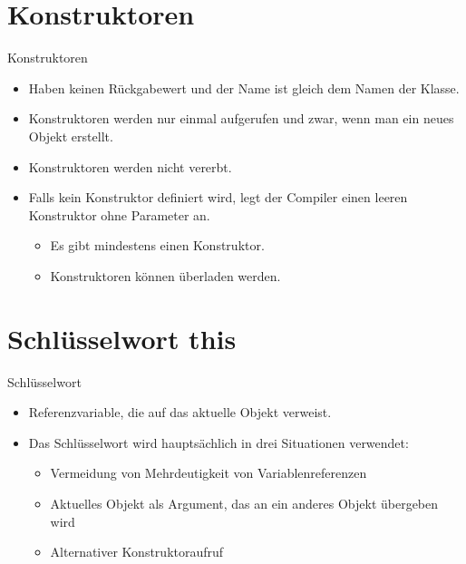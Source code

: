 \documentclass{../tuda-beamer}
\begin{document}
  \section{Konstruktoren}
  \begin{frame}{Konstruktoren}
    \begin{itemize}
      \item Haben keinen Rückgabewert und der Name ist gleich dem Namen der Klasse.
      \item Konstruktoren werden nur einmal aufgerufen und zwar, wenn man ein neues Objekt erstellt.
      \item Konstruktoren werden nicht vererbt.
      \item Falls kein Konstruktor definiert wird, legt der Compiler einen leeren Konstruktor ohne
      Parameter an.
      \begin{itemize}
        \item Es gibt mindestens einen Konstruktor.
        \item Konstruktoren können überladen werden.
      \end{itemize}

      
    \end{itemize}
  \end{frame}

  \begin{frame}[c]
    
  \end{frame}


  \section{Schlüsselwort this}
  \begin{frame}{Schlüsselwort }
    \begin{itemize}
      \item Referenzvariable, die auf das aktuelle Objekt verweist.
      \item Das Schlüsselwort  wird hauptsächlich in drei Situationen verwendet:
      \begin{itemize}
        \item Vermeidung von Mehrdeutigkeit von Variablenreferenzen
        \item Aktuelles Objekt als Argument, das an ein anderes Objekt übergeben wird
        \item Alternativer Konstruktoraufruf
      \end{itemize}
    \end{itemize}
  \end{frame}
\end{document}
